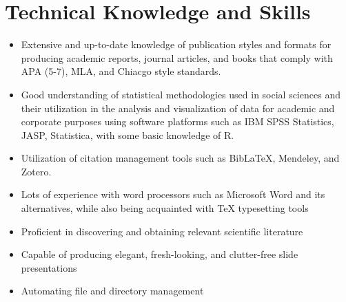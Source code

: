\section{Technical Knowledge and Skills}

\begin{itemize}
\item Extensive and up-to-date knowledge of publication styles and formats for producing academic reports, journal articles, and books that comply with APA (5-7), MLA, and Chiacgo style standards.
\item Good understanding of statistical methodologies used in social sciences and their utilization in the analysis and visualization of data for academic and corporate purposes using software platforms such as IBM SPSS Statistics, JASP, Statistica, with some basic knowledge of R.
\item Utilization of citation management tools  such as BibLaTeX, Mendeley, and Zotero.
\item Lots of experience with word processors such as Microsoft Word and its alternatives, while also being acquainted with TeX typesetting tools
\item Proficient in discovering and obtaining relevant scientific literature
\item Capable of producing elegant, fresh-looking, and clutter-free slide presentations
\item Automating file and directory management
\end{itemize} 
